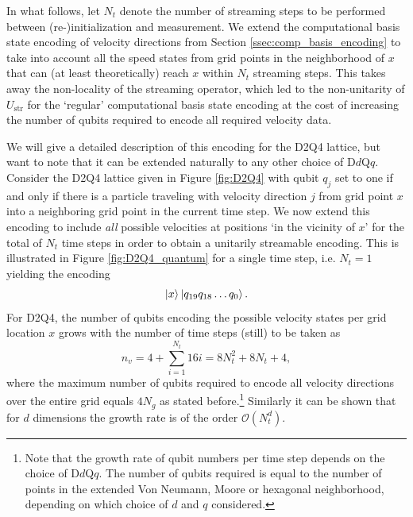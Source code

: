 In what follows, let $N_t$ denote the number of streaming steps to be performed between (re-)initialization and measurement. We extend the computational basis state encoding of velocity directions from Section \ref{ssec:comp_basis_encoding} to take into account all the speed states from grid points in the neighborhood of $x$ that can (at least theoretically) reach $x$ within $N_t$ streaming steps. This takes away the non-locality of the streaming operator, which led to the non-unitarity of $U_\text{str}$ for the `regular' computational basis state encoding at the cost of increasing the number of qubits required to encode all required velocity data.

We will give a detailed description of this encoding for the D2Q4 lattice, but want to note that it can be extended naturally to any other choice of D$d$Q$q$. Consider the D2Q4 lattice given in Figure \ref{fig:D2Q4} with qubit $q_j$ set to one if and only if there is a particle traveling with velocity direction $j$ from grid point $x$ into a neighboring grid point in the current time step. We now extend this encoding to include \emph{all} possible velocities at positions `in the vicinity of $x$' for the total of $N_t$ time steps in order to obtain a unitarily streamable encoding. This is illustrated in Figure \ref{fig:D2Q4_quantum} for a single time step, i.e. $N_t=1$ yielding the encoding
\begin{equation}
    \ket{x}\ket{q_{19}q_{18} \dots q_0}.
\end{equation}
For D2Q4, the number of qubits encoding the possible velocity states per grid location $x$ grows with the number of time steps (still) to be taken as
\begin{equation}\label{eq:von_Neumann}
    n_v = 4 + \sum_{i=1}^{N_t}16i = 8N_t^2 + 8N_t + 4,
\end{equation}
where the maximum number of qubits required to encode all velocity directions over the entire grid equals $4N_g$ as stated before.\footnote{Note that the growth rate of qubit numbers per time step depends on the choice of D$d$Q$q$. The number of qubits required is equal to the number of points in the extended Von Neumann, Moore or hexagonal neighborhood, depending on which choice of $d$ and $q$ considered.}
Similarly it can be shown that for $d$ dimensions the growth rate is of the order $\mathcal{O}\left (N_t^d \right)$.

